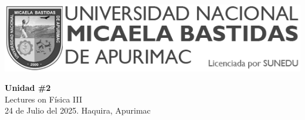 

\begin{minipage}[l]{0.42\textwidth}
    \includegraphics[width=1\textwidth]{img/logo-UNAMBA.png}
\end{minipage}
\hfill
\begin{minipage}[c]{0.5\textwidth}
    \begin{flushright}
	\large{\textbf{Unidad \#2}}\\
	\large{Lectures on Física III}\\
	\large{24 de Julio del 2025. Haquira, Apurimac}\\
    \end{flushright}
\end{minipage}


  
